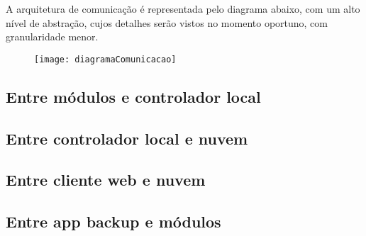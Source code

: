 A arquitetura de comunicação é representada pelo diagrama abaixo, com um alto nível de abstração, cujos detalhes serão vistos no momento oportuno, com granularidade menor.

\begin{figure}[H]
	\centering
	\caption{}
  \texttt{[image: diagramaComunicacao]}
\label{fig:diagramaComunicacao}
\end{figure}

\subsection{Entre módulos e controlador local}
\subsection{Entre controlador local e nuvem}
\subsection{Entre cliente web e nuvem}
\subsection{Entre app backup e módulos}

